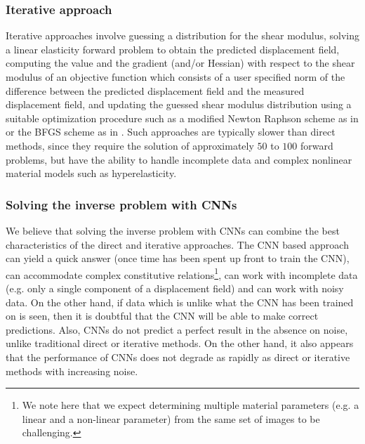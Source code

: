 \documentclass[12pt]{article}
\begin{document}
\subsubsection{Iterative approach} Iterative approaches \cite{paper:oberai2003,paper:gokhale2008,paper:kalle1996,paper:doyley,paper:goenezen2011} involve guessing a distribution for the shear modulus, solving a linear elasticity forward problem to obtain the predicted displacement field, computing the value and the gradient (and/or Hessian) with respect to the shear modulus of an objective function which consists of a user specified norm of the difference between the predicted displacement field and the measured displacement field, and updating the guessed shear modulus distribution using a suitable optimization procedure such as a modified Newton Raphson scheme as in \cite{paper:doyley} or the BFGS scheme as in \cite{paper:gokhale2008,paper:goenezen2011}. Such approaches are typically slower than direct methods, since they require the solution of approximately $50$ to $100$ forward problems, but have the ability to handle incomplete data and complex nonlinear material models such as hyperelasticity.
\subsubsection{Solving the inverse problem with CNNs}
We believe that solving the inverse problem with CNNs can combine the best characteristics of the direct and iterative approaches. The CNN based approach can yield a quick answer (once time has been spent up front to train the CNN), can accommodate complex constitutive relations\footnote{We note here that we expect determining multiple material parameters (e.g. a linear and a non-linear parameter) from the same set of images to be challenging.}, can work with incomplete data (e.g. only a single component of a displacement field) and can work with noisy data. On the other hand, if data which is unlike what the CNN has been trained on is seen, then it is doubtful that the CNN will be able to make correct predictions. Also, CNNs do not predict a perfect result in the absence on noise, unlike traditional direct or iterative methods. On the other hand, it also appears that the performance of CNNs does not degrade as rapidly as direct or iterative methods with increasing noise.
\end{document}
